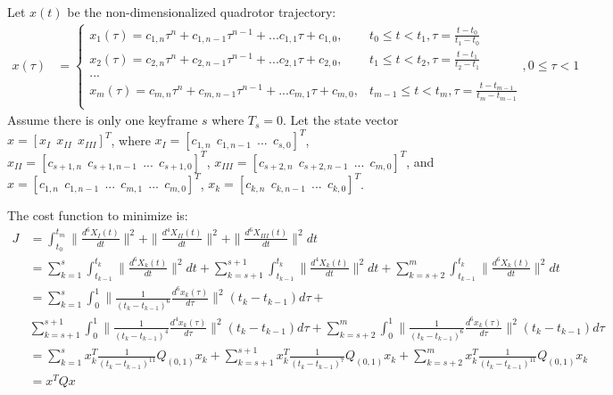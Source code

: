 \documentclass[11pt]{article}
\begin{document}
\mbox{}\newline
Let $x(t)$ be the non-dimensionalized quadrotor trajectory:
\begin{align*}
x(\tau) &= 
\begin{cases}
    x_1 (\tau) = c_{1, n} \tau^n + c_{1, n-1} \tau^{n-1} + ... c_{1, 1} \tau + c_{1, 0}, & t_0 \le t < t_1, \tau = \frac{t-t_0}{t_1-t_0}  \\
    x_2 (\tau) = c_{2, n} \tau^n + c_{2, n-1} \tau^{n-1} + ... c_{2, 1} \tau + c_{2, 0}, & t_1 \le t < t_2, \tau = \frac{t-t_1}{t_2-t_1}  \\
    ... \\
    x_m (\tau) = c_{m, n} \tau^n + c_{m, n-1} \tau^{n-1} + ... c_{m, 1} \tau + c_{m, 0}, & t_{m-1} \le t < t_m, \tau = \frac{t-t_{m-1}}{t_m-t_{m-1}} \\
\end{cases},  0 \le \tau < 1
\end{align*} 
Assume there is only one keyframe $s$ where $T_s = 0$. Let the state vector $x = [x_I \ \ x_{II} \ \ x_{III}]^T$, where $x_I = [c_{1, n} \ \ c_{1, n-1} \ \ ... \ \ c_{s, 0} ]^T$, $x_{II} = [c_{s+1, n} \ \ c_{s+1, n-1} \ \ ... \ \ c_{s+1, 0}]^T$, $x_{III} = [c_{s+2, n} \ \ c_{s+2, n-1} \ \ ... \ \ c_{m, 0} ]^T$, and $x = [c_{1, n} \ \ c_{1, n-1} \ \ ... \ \ c_{m, 1} \ \ ... \ \ c_{m, 0} ]^T$, $x_k = [c_{k, n} \ \ c_{k, n-1} \ \ ... \ \ c_{k, 0} ]^T$. 




\newpage
The cost function to minimize is:
\begin{align*}
J &= \int_{t_0}^{t_m} \|  \frac{d^{6} X_I(t) }{dt} \|^2 + \|  \frac{d^{4} X_{II}(t) }{dt} \|^2 + \|  \frac{d^{6} X_{III}(t) }{dt} \|^2 dt \\
&= \sum_{k=1}^{s} \int_{t_{k-1}}^{t_k} \|  \frac{d^{6} X_k (t) }{dt} \|^2 dt +\sum_{k=s+1}^{s+1} \int_{t_{k-1}}^{t_k} \|  \frac{d^{4} X_k (t) }{dt} \|^2 dt +\sum_{k=s+2}^{m} \int_{t_{k-1}}^{t_k} \|  \frac{d^{6} X_k (t) }{dt} \|^2 dt  \\
&= \sum_{k=1}^{s} \int_{0}^{1}  \| \frac{1}{(t_k-t_{k-1})^{6}} \frac{d^{6} x_k (\tau) }{d\tau} \|^2 (t_k-t_{k-1}) d\tau + \\
&  \sum_{k=s+1}^{s+1} \int_{0}^{1}  \|   \frac{1}{(t_k-t_{k-1})^{4}} \frac{ d^{4} x_k (\tau) }{d\tau} \|^2 (t_k-t_{k-1}) d\tau + \sum_{k=s+2}^{m} \int_{0}^{1}  \|  \frac{1}{(t_k-t_{k-1})^{6}} \frac{  d^{6} x_k (\tau) }{d\tau} \|^2 (t_k-t_{k-1}) d\tau  \\
&=  \sum_{k=1}^{s} x_k^T \frac{1}{(t_k-t_{k-1})^{11}} Q_{(0, 1)} x_k + \sum_{k=s+1}^{s+1} x_k^T \frac{1}{(t_k-t_{k-1})^{7}} Q_{(0, 1)} x_k  + \sum_{k=s+2}^{m} x_k^T \frac{1}{(t_k-t_{k-1})^{11}} Q_{(0, 1)} x_k \\
&= x^T Q x 
\end{align*}
\end{document}
